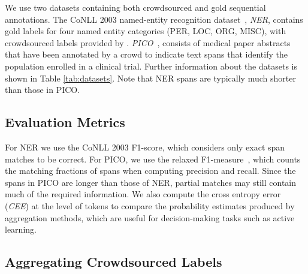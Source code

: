 We use two datasets containing both crowdsourced and gold sequential annotations. 
The CoNLL 2003 named-entity recognition dataset~\cite{tjong2003introduction},
\emph{NER}, contains gold labels for four named entity categories (PER, LOC, ORG, MISC),
with crowdsourced labels provided by \cite{rodrigues2014sequence}.
\emph{PICO}~\cite{nguyen2017aggregating}, 
consists of medical paper abstracts that have been annotated by a crowd to indicate text spans that identify the population enrolled in a clinical trial. 
Further information about the datasets is shown in Table \ref{tab:datasets}. Note that NER spans are typically much shorter than those in PICO.

\subsection{Evaluation Metrics}

For NER we use the CoNLL 2003 F1-score, which considers only exact span matches %
to be correct. 
For PICO, we use the relaxed F1-measure~\cite{nguyen2017aggregating}, which counts the matching fractions of spans when computing precision and recall.
Since the spans in PICO are longer than those of NER, partial matches may still contain much of the required information. 
We also compute the cross entropy error (\emph{CEE}) at the level of tokens
to compare the probability estimates produced by aggregation methods, which are useful for decision-making tasks such as active learning.

\subsection{Aggregating Crowdsourced Labels}\label{sec:task1}

